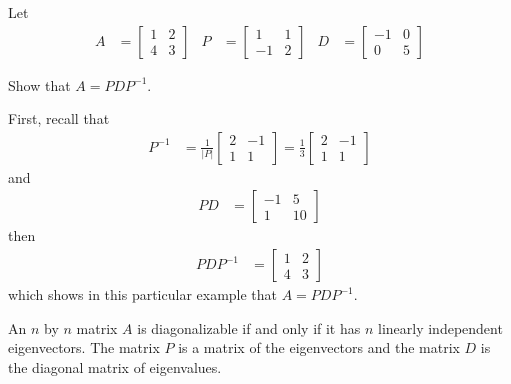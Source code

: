 \begin{example}
Let 
%
\begin{align*}
A &= 
\begin{bmatrix}
1 & 2 \\ 4 & 3
\end{bmatrix}
& P& = \begin{bmatrix}
1 &  1 \\
-1 & 2 
\end{bmatrix} & D & = \begin{bmatrix}
-1 & 0 \\
0 & 5 
\end{bmatrix}
\end{align*}

Show that $ A = P D P^{-1}$.  

First, recall that 
% 
\begin{align*}
P^{-1} & = \frac{1}{|P|} \begin{bmatrix}
2 & -1 \\
1 & 1  
\end{bmatrix} = \frac{1}{3} \begin{bmatrix}
2 & -1 \\
1 & 1 
\end{bmatrix}
\end{align*}
and
\begin{align*}
P D & = \begin{bmatrix}
-1 & 5 \\
1 & 10 
\end{bmatrix}
\end{align*} then
\begin{align*}
P D P^{-1} & =  \begin{bmatrix}
1 & 2 \\
4 & 3 
\end{bmatrix}
\end{align*}
%
which shows in this particular example that $A=PDP^{-1}$.  



\end{example}


\begin{theorem}
An $n$ by $n$ matrix $A$ is diagonalizable if and only if it has $n$ linearly independent eigenvectors.  The matrix $P$ is a matrix of the eigenvectors and the matrix $D$ is the diagonal matrix of eigenvalues.  
\end{theorem}


